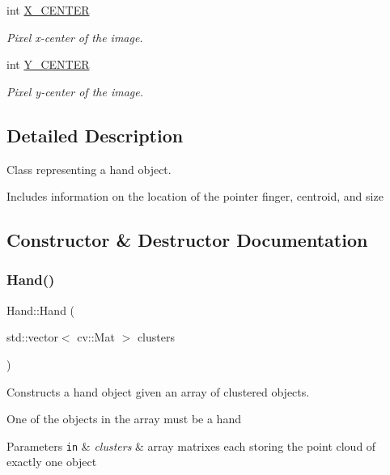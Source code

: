 \begin{DoxyCompactItemize}
\hypertarget{class_hand_aee740c8161bd4bdd1f8f77a6d52dc65e}{}\label{class_hand_aee740c8161bd4bdd1f8f77a6d52dc65e} 
int \hyperlink{class_hand_aee740c8161bd4bdd1f8f77a6d52dc65e}{X\+\_\+\+C\+E\+N\+T\+ER}
\begin{DoxyCompactList}\small\item\em Pixel x-\/center of the image. \end{DoxyCompactList}\item 
\hypertarget{class_hand_ab213d81fcf0ed7086ba82540824c3fd9}{}\label{class_hand_ab213d81fcf0ed7086ba82540824c3fd9} 
int \hyperlink{class_hand_ab213d81fcf0ed7086ba82540824c3fd9}{Y\+\_\+\+C\+E\+N\+T\+ER}
\begin{DoxyCompactList}\small\item\em Pixel y-\/center of the image. \end{DoxyCompactList}\end{DoxyCompactItemize}


\subsection{Detailed Description}
Class representing a hand object. 

Includes information on the location of the pointer finger, centroid, and size 

\subsection{Constructor \& Destructor Documentation}
\hypertarget{class_hand_a77bc39dbcb8eee3927dd326b22bd3ae7}{}\label{class_hand_a77bc39dbcb8eee3927dd326b22bd3ae7} 
\subsubsection{\texorpdfstring{Hand()}{Hand()}}
{\footnotesize\ttfamily Hand\+::\+Hand (\begin{DoxyParamCaption}\item[{std\+::vector$<$ cv\+::\+Mat $>$}]{clusters }\end{DoxyParamCaption})}



Constructs a hand object given an array of clustered objects. 

One of the objects in the array must be a hand 
\begin{DoxyParams}[1]{Parameters}
\mbox{\tt in}  & {\em clusters} & array matrixes each storing the point cloud of exactly one object \\
\hline
\end{DoxyParams}


